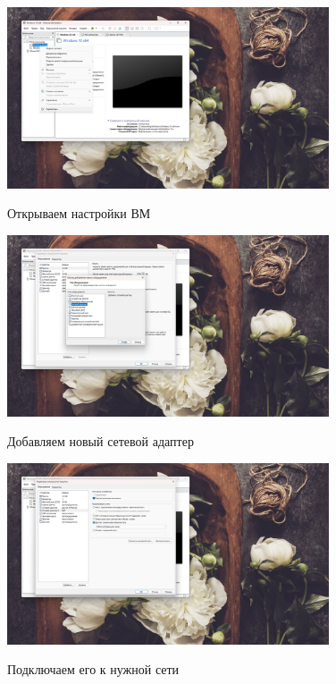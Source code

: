 \documentclass[a4paper]{article}
\begin{document}
  \begin{figure}[H]
    \centering
    \includegraphics[width=0.85\textwidth]{06_00 (61)}
    \label{img:61}
    \caption{Открываем настройки ВМ}
  \end{figure}
  
  \begin{figure}[H]
    \centering
    \includegraphics[width=0.85\textwidth]{06_00 (62)}
    \label{img:62}
    \caption{Добавляем новый сетевой адаптер}
  \end{figure}
  
  \begin{figure}[H]
    \centering
    \includegraphics[width=0.85\textwidth]{06_00 (63)}
    \label{img:63}
    \caption{Подключаем его к нужной сети}
  \end{figure}
  
\end{document}
